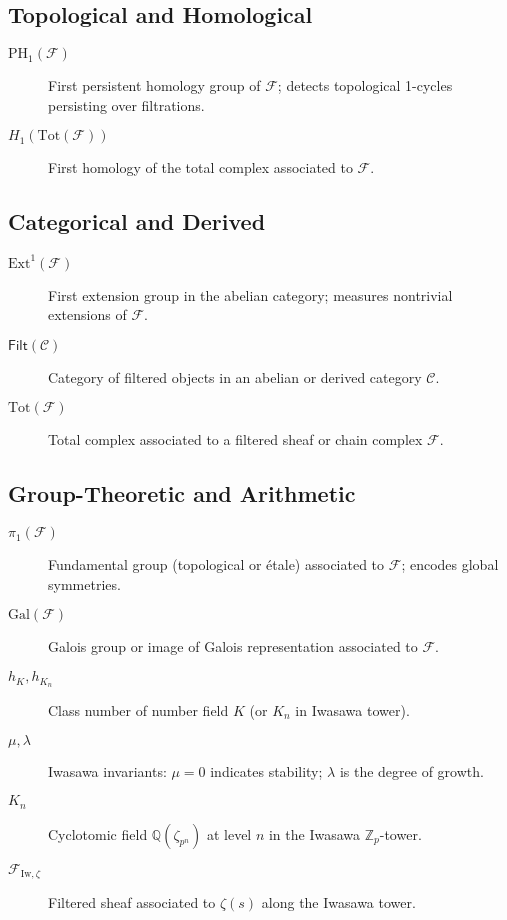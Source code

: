 \documentclass[11pt]{article}
\begin{document}
\subsection*{Topological and Homological}

\begin{description}
  \item[$\mathrm{PH}_1(\mathcal{F})$] First persistent homology group of $\mathcal{F}$; detects topological 1-cycles persisting over filtrations.
  \item[$H_1(\mathrm{Tot}(\mathcal{F}))$] First homology of the total complex associated to $\mathcal{F}$.
\end{description}

\subsection*{Categorical and Derived}

\begin{description}
  \item[$\mathrm{Ext}^1(\mathcal{F})$] First extension group in the abelian category; measures nontrivial extensions of $\mathcal{F}$.
  \item[$\mathsf{Filt}(\mathcal{C})$] Category of filtered objects in an abelian or derived category $\mathcal{C}$.
  \item[$\mathrm{Tot}(\mathcal{F})$] Total complex associated to a filtered sheaf or chain complex $\mathcal{F}$.
\end{description}

\subsection*{Group-Theoretic and Arithmetic}

\begin{description}
  \item[$\pi_1(\mathcal{F})$] Fundamental group (topological or étale) associated to $\mathcal{F}$; encodes global symmetries.
  \item[$\mathrm{Gal}(\mathcal{F})$] Galois group or image of Galois representation associated to $\mathcal{F}$.
  \item[$h_K, h_{K_n}$] Class number of number field $K$ (or $K_n$ in Iwasawa tower).
  \item[$\mu, \lambda$] Iwasawa invariants: $\mu = 0$ indicates stability; $\lambda$ is the degree of growth.
  \item[$K_n$] Cyclotomic field $\mathbb{Q}(\zeta_{p^n})$ at level $n$ in the Iwasawa $\mathbb{Z}_p$-tower.
  \item[$\mathcal{F}_{\mathrm{Iw}, \zeta}$] Filtered sheaf associated to $\zeta(s)$ along the Iwasawa tower.
\end{description}
\end{document}
